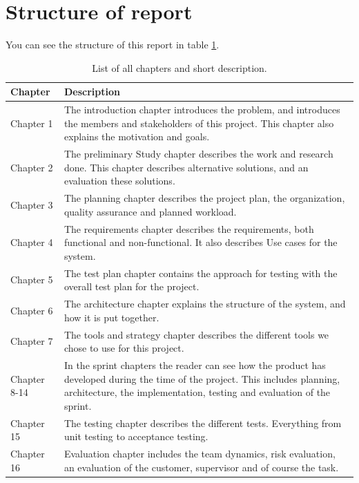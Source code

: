 \section{Structure of report}
You can see the structure of this report in table \ref{tab:structure_of_report}.
\begin{table}[!h]\centering
\caption{List of all chapters and short description. }
\label{tab:structure_of_report}
\def\arraystretch{1.3}
\begin{tabularx}{\textwidth}{lX} \toprule[1mm]
\textbf{Chapter} & \textbf{Description} \\ \midrule
Chapter 1 & The introduction chapter introduces the problem, and introduces the members and stakeholders of this project.
This chapter also explains the motivation and goals. \\
Chapter 2 &  The preliminary Study chapter describes the work and research done. This chapter describes alternative solutions, and an evaluation these solutions. \\
Chapter 3 &  The planning chapter describes the project plan, the organization, quality assurance and planned workload.  \\

Chapter 4 &  The requirements chapter describes the requirements, both functional and non-functional. It also describes Use cases for the system. \\

Chapter 5 &  The test plan chapter contains the approach for testing with the overall test plan for the project.\\

Chapter 6	 &  The architecture chapter explains the structure of the system, and how it is put together. \\

Chapter 7	 &   The tools and strategy chapter describes the different tools we chose to use for this project.\\

Chapter 8-14 	&  In the sprint chapters the reader can see how the product has developed during the time of the project. This includes planning, architecture, the implementation, testing and evaluation of the sprint. \\

Chapter 15 	 &  The testing chapter describes the different tests. Everything from unit testing to acceptance testing. \\

Chapter 16 	 &  Evaluation chapter includes the team dynamics, risk evaluation, an evaluation of the customer, supervisor and of course the task. \\


\end{tabularx}
\end{table}
